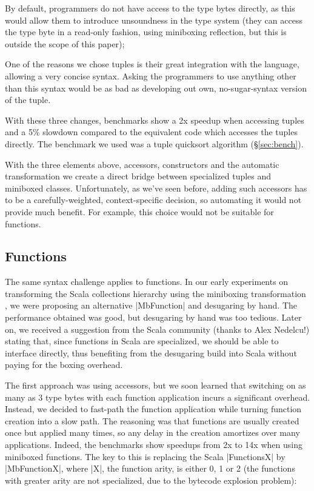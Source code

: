 \begin{compactitem}
 \item By default, programmers do not have access to the type bytes directly, as this would allow them to introduce unsoundness in the type system (they can access the type byte in a read-only fashion, using miniboxing reflection, but this is outside the scope of this paper);
 \item One of the reasons we chose tuples is their great integration with the language, allowing a very concise syntax. Asking the programmers to use anything other than this syntax would be as bad as developing out own, no-sugar-syntax version of the tuple.
\end{compactitem}

With these three changes, benchmarks show a 2x speedup when accessing tuples and a 5\% slowdown compared to the equivalent code which accesses the tuples directly. The benchmark we used was a tuple quicksort algorithm (\S\ref{sec:bench}).

With the three elements above, accessors, constructors and the automatic transformation we create a direct bridge between specialized tuples and miniboxed classes. Unfortunately, as we've seen before, adding such accessors has to be a carefully-weighted, context-specific decision, so automating it would not provide much benefit. For example, this choice would not be suitable for functions.

\subsection{Functions}
\label{sec:functions}

The same syntax challenge applies to functions. In our early experiments on transforming the Scala collections hierarchy using the miniboxing transformation \cite{miniboxing-linkedlist}, we were proposing an alternative |MbFunction| and desugaring by hand. The performance obtained was good, but desugaring by hand was too tedious. Later on, we received a suggestion from the Scala community (thanks to Alex Nedelcu!) stating that, since functions in Scala are specialized, we should be able to interface directly, thus benefiting from the desugaring build into Scala without paying for the boxing overhead.

The first approach was using accessors, but we soon learned that switching on as many as 3 type bytes with each function application incurs a significant overhead. Instead, we decided to fast-path the function application while turning function creation into a slow path. The reasoning was that functions are usually created once but applied many times, so any delay in the creation amortizes over many applications. Indeed, the benchmarks show speedups from 2x to 14x when using miniboxed functions. The key to this is replacing the Scala |FunctionsX| by |MbFunctionX|, where |X|, the function arity, is either 0, 1 or 2 (the functions with greater arity are not specialized, due to the bytecode explosion problem):

